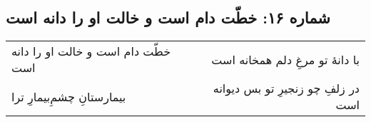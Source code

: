 \begin{center}
\section*{شماره ۱۶: خطّت دام است و خالت او را دانه است}
\label{sec:016}
\begin{longtable}{l p{0.5cm} r}
خطّت دام است و خالت او را دانه است
&&
با دانهٔ تو مرغِ دلم همخانه است
\\
بیمارستانِ چشمِ‌بیمارِ ترا
&&
در زلفِ چو زنجیرِ تو بس دیوانه است
\\
\end{longtable}
\end{center}
